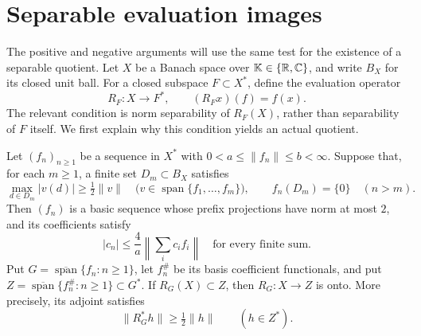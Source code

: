 \section{Separable evaluation images}
\label{sec:evaluation}

The positive and negative arguments will use the same test for the existence
of a separable quotient.  Let $X$ be a Banach space over
$\mathbb K\in\{\mathbb R,\mathbb C\}$, and write $B_X$ for its closed unit ball.
For a closed subspace $F\subset X^*$, define the evaluation operator
\[
 R_F:X\longrightarrow F^*,\qquad (R_Fx)(f)=f(x).
\]
The relevant condition is norm separability of $R_F(X)$, rather than
separability of $F$ itself.  We first explain why this condition yields an
actual quotient.

\begin{lemma}\label{ev:prefix}
Let $(f_n)_{n\ge1}$ be a sequence in $X^*$ with
$0<a\le\|f_n\|\le b<\infty$.  Suppose that, for each $m\ge1$, a finite
set $D_m\subset B_X$ satisfies
\begin{equation}\label{ev:normers}
 \max_{d\in D_m}|v(d)|\ge\tfrac12\|v\|
 \quad\bigl(v\in\operatorname{span}\{f_1,\ldots,f_m\}\bigr),
 \qquad f_n(D_m)=\{0\}\quad(n>m).
\end{equation}
Then $(f_n)$ is a basic sequence whose prefix projections have norm at most
$2$, and its coefficients satisfy
\begin{equation}\label{ev:coefficients}
 |c_n|\le\frac4a\left\|\sum_i c_i f_i\right\|
 \quad\text{for every finite sum.}
\end{equation}
Put $G=\overline{\operatorname{span}}\{f_n:n\ge1\}$, let $f_n^\#$ be its
basis coefficient functionals, and put
$Z=\overline{\operatorname{span}}\{f_n^\#:n\ge1\}\subset G^*$.
If $R_G(X)\subset Z$, then $R_G:X\to Z$ is onto.  More precisely, its
adjoint satisfies
\[
 \|R_G^*h\|\ge\tfrac12\|h\|\qquad(h\in Z^*).
\]
\end{lemma}

